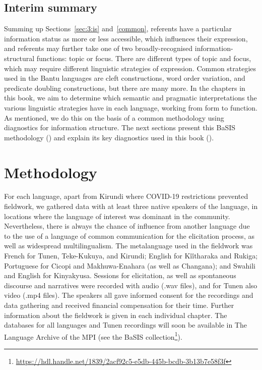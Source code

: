 \documentclass[output=paper]{langscibook}
\begin{document}
\subsection{Interim summary}

Summing up Sections~\ref{sec:3:is} and~\ref{common}, referents have a particular information status as more or less accessible, which influences their expression, and referents may further take one of two broadly-recognised information-structural functions: topic or focus. There are different types of topic and focus, which may require different linguistic strategies of expression. Common strategies used in the Bantu languages are cleft constructions, word order variation, and predicate doubling constructions, but there are many more. In the chapters in this book, we aim to determine which semantic and pragmatic interpretations the various linguistic strategies have in each language, working from form to function. As mentioned, we do this on the basis of a common methodology using diagnostics for information structure. The next sections present this BaSIS methodology () and explain its key diagnostics used in this book ().

\section{Methodology}
\label{bkm:Ref117846286}
For each language, apart from Kirundi where COVID-19 restrictions prevented fieldwork, we gathered data with at least three native speakers of the language, in locations where the language of interest was dominant in the community. Nevertheless, there is always the chance of influence from another language due to the use of a language of common communication for the elicitation process, as well as widespread multilingualism. The metalanguage used in the fieldwork was French for Tunen, Teke-Kukuya, and Kirundi; English for Kîîtharaka and Rukiga; Portuguese for Cicopi and Makhuwa-Enahara (as well as Changana); and Swahili and English for Kinyakyusa. Sessions for elicitation, as well as spontaneous discourse and narratives were recorded with audio (.wav files), and for Tunen also video (.mp4 files). The speakers all gave informed consent for the recordings and data gathering and received financial compensation for their time. Further information about the fieldwork is given in each individual chapter. The databases for all languages and Tunen recordings will soon be available in The Language Archive of the MPI (see the BaSIS collection\footnote{\url{https://hdl.handle.net/1839/2acf92c5-e5db-445b-bcdb-3b13b7e58f3f}}).
\end{document}
